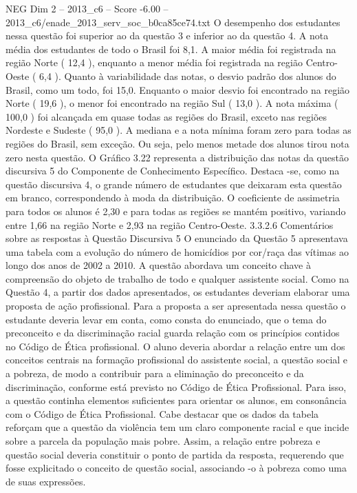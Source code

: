 \begin{textsample}{NEG Dim 2 – 2013\_c6 – Score -6.00 – 2013\_c6/enade\_2013\_serv\_soc\_b0ca85ce74.txt}
O desempenho dos estudantes nessa questão foi superior ao da questão 3 e inferior ao da questão 4.
A nota média dos estudantes de todo o Brasil foi 8,1.
A maior média foi registrada na região Norte ( 12,4 ), enquanto a menor média foi registrada na região Centro-Oeste ( 6,4 ).
Quanto à variabilidade das notas, o desvio padrão dos alunos do Brasil, como um todo, foi 15,0.
Enquanto o maior desvio foi encontrado na região Norte ( 19,6 ), o menor foi encontrado na região Sul ( 13,0 ).
A nota máxima ( 100,0 ) foi alcançada em quase todas as regiões do Brasil, exceto nas regiões Nordeste e Sudeste ( 95,0 ).
A mediana e a nota mínima foram zero para todas as regiões do Brasil, sem exceção.
Ou seja, pelo menos metade dos alunos tirou nota zero nesta questão.
O Gráfico 3.22 representa a distribuição das notas da questão discursiva 5 do Componente de Conhecimento Específico.
Destaca -se, como na questão discursiva 4, o grande número de estudantes que deixaram esta questão em branco, correspondendo à moda da distribuição.
O coeficiente de assimetria para todos os alunos é 2,30 e para todas as regiões se mantém positivo, variando entre 1,66 na região Norte e 2,93 na região Centro-Oeste. 3.3.2.6 Comentários sobre as respostas à Questão Discursiva 5 O enunciado da Questão 5 apresentava uma tabela com a evolução do número de homicídios por cor/raça das vítimas ao longo dos anos de 2002 a 2010.
A questão abordava um conceito chave à compreensão do objeto de trabalho de todo e qualquer assistente social.
Como na Questão 4, a partir dos dados apresentados, os estudantes deveriam elaborar uma proposta de ação profissional.
Para a proposta a ser apresentada nessa questão o estudante deveria levar em conta, como consta do enunciado, que o tema do preconceito e da discriminação racial guarda relação com os princípios contidos no Código de Ética profissional.
O aluno deveria abordar a relação entre um dos conceitos centrais na formação profissional do assistente social, a questão social e a pobreza, de modo a contribuir para a eliminação do preconceito e da discriminação, conforme está previsto no Código de Ética Profissional.
Para isso, a questão continha elementos suficientes para orientar os alunos, em consonância com o Código de Ética Profissional.
Cabe destacar que os dados da tabela reforçam que a questão da violência tem um claro componente racial e que incide sobre a parcela da população mais pobre.
Assim, a relação entre pobreza e questão social deveria constituir o ponto de partida da resposta, requerendo que fosse explicitado o conceito de questão social, associando -o à pobreza como uma de suas expressões.

\end{textsample}
